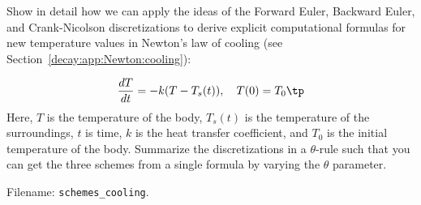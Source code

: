 \documentclass[graybox,sectrefs,envcountresetchap,open=right,final]{svmonodo}
\makeatletter
\newenvironment{doconceexercise}{}{}
\newcounter{doconceexercisecounter}%
\newcommand\listofexercises{
\chapter*{List of Exercises, Problems, and Projects
          \@mkboth{List of Exercises, Problems, and Projects}{List of Exercises, Problems, and Projects}}
\markboth{List of Exercises, Problems, and Projects}{List of Exercises, Problems, and Projects}
\@starttoc{loe}
}
\makeatother
\begin{document}
\begin{doconceexercise}

                
\label{decay:app:exer:cooling:schemes}

Show in detail how we can apply the ideas of the Forward Euler,
Backward Euler, and Crank-Nicolson
discretizations to derive explicit
computational formulas for new temperature values in Newton's law of
cooling (see Section~\ref{decay:app:Newton:cooling}):

\[
\frac{dT}{dt} = -k(T-T_s(t)),\quad T(0)=T_0\tp
\]
Here, $T$ is the temperature of the body, $T_s(t)$ is the temperature
of the surroundings, $t$ is time, $k$ is the heat transfer
coefficient, and $T_0$ is the initial temperature of the body.
Summarize the discretizations in a $\theta$-rule
such that you can get the three
schemes from a single formula by varying the $\theta$ parameter.

\noindent Filename: \Verb!schemes_cooling!.

\end{doconceexercise}
\end{document}

